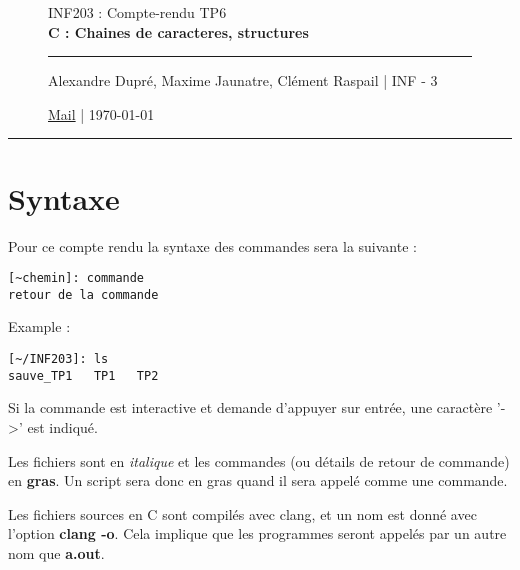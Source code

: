 \documentclass[12pt,a4paper,notitlepage,colorinlistoftodos]{article}
\begin{document}
\begin{figure}
    \begin{minipage}{.75\textwidth}
    \begin{center}
    {\Large INF203 : Compte-rendu TP6 \\ \textbf{C : Chaines de caracteres, structures}}
    \end{center}
    \rule{7em}{.4pt}\par
     Alexandre Dupré, Maxime Jaunatre, Clément Raspail | INF - 3 \par 
     \href{mailto:alexandre.dupre@etu.univ-grenoble-alpes.fr,maxime.jaunatre@etu.univ-grenoble-alpes.fr, clement.raspail@etu.univ-grenoble-alpes.fr}{Mail} | \today
\end{minipage}
\end{figure}

\hrule

\section*{Syntaxe}

\iffalse
 Alexandre Dupré <alexandre.dupre@etu.univ-grenoble-alpes.fr>
 Maxime Jaunatre <maxime.jaunatre@etu.univ-grenoble-alpes.fr> 
 Clément Raspail <clement.raspail@etu.univ-grenoble-alpes.fr>
\fi

Pour ce compte rendu la syntaxe des commandes sera la suivante :
\begin{lstlisting}
[~chemin]: commande
retour de la commande
\end{lstlisting}

Example :
\begin{lstlisting}
[~/INF203]: ls
sauve_TP1   TP1   TP2
\end{lstlisting}

Si la commande est interactive et demande d'appuyer  sur entrée, une caractère '->' est indiqué.

Les fichiers sont en \textit{italique} et les commandes (ou détails de retour de commande) en \textbf{gras}. Un script sera donc en gras quand il sera appelé comme une commande.


Les fichiers sources en C sont compilés avec clang, et un nom est donné avec l'option \textbf{clang -o}. Cela implique que les programmes seront appelés par un autre nom que \textbf{a.out}.
\end{document}
